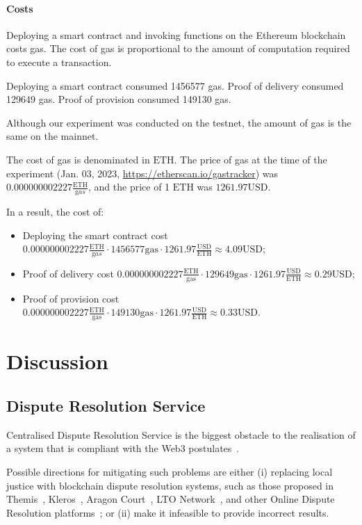 \documentclass[pdftex,twocolumn,epjc3]{svjour3}
\begin{document}
{\paragraph{Costs}
Deploying a smart contract and invoking functions on the Ethereum blockchain costs gas. The cost of gas is proportional to the amount of computation required to execute a transaction. 

Deploying a smart contract consumed 1456577 gas.
Proof of delivery consumed 129649 gas.
Proof of provision consumed 149130 gas.

Although our experiment was conducted on the testnet, the amount of gas is the same on the mainnet.

The cost of gas is denominated in $\mathrm{ETH}$. The price of gas at the time of the experiment (Jan. 03, 2023, \url{https://etherscan.io/gastracker}) was $0.000000002227 \frac{\mathrm{ETH}}{\mathrm gas}$, and the price of 1 $\mathrm{ETH}$ was $1261.97 \mathrm{USD}$.

In a result, the cost of:
\begin{itemize}
  \item Deploying the smart contract cost $0.000000002227 \frac{\mathrm{ETH}}{\mathrm gas} \cdot 1456577 \mathrm{gas} \cdot 1261.97 \frac{\mathrm{USD}}{\mathrm{ETH}} \approx 4.09 \mathrm{USD}$; 
  \item Proof of delivery cost $0.000000002227 \mathrm{\frac{ETH}{gas}} \cdot 129649 \mathrm{gas} \cdot 1261.97 \frac{\mathrm{USD}}{\mathrm{ETH}} \approx 0.29 \mathrm{USD}$; 
  \item Proof of provision cost $0.000000002227 \mathrm{\frac{ETH}{gas}} \cdot 149130 \mathrm{gas} \cdot 1261.97 \frac{\mathrm{USD}}{\mathrm{ETH}} \approx 0.33 \mathrm{USD}$.
\end{itemize}


\section{Discussion}
\label{sec:discussion}

\subsection{Dispute Resolution Service}\label{sec:decentralised-justice}
Centralised Dispute Resolution Service is the biggest obstacle to the realisation of a system that is compliant with the Web3 postulates~\cite{ethereumWhatWeb3Why2023}.

Possible directions for mitigating such problems are either (i) replacing local justice with blockchain dispute resolution systems, such as those proposed in Themis~\cite{mengThemisDecentralizedEscrow2019}, Kleros~\cite{bergollaKlerosSociolegalCase2022, gudkovCrowdArbitrationBlockchain2020}, Aragon Court~\cite{aragonDecentralizedDisputeResolution}, LTO Network~\cite{ltonetworkNextGenBlockchainB2B}, and other Online Dispute Resolution platforms~\cite{allenGovernanceBlockchainDispute2019}; or (ii) make it infeasible to provide incorrect results.

}
\end{document}
